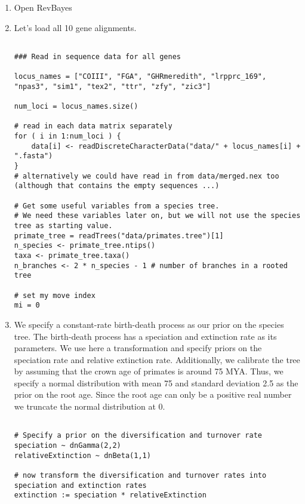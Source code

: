 \begin{enumerate}
\item Open RevBayes
\item Let's load all 10 gene alignments.

{\tt \begin{snugshade*}
\begin{lstlisting}

### Read in sequence data for all genes

locus_names = ["COIII", "FGA", "GHRmeredith", "lrpprc_169", "npas3", "sim1", "tex2", "ttr", "zfy", "zic3"]

num_loci = locus_names.size()

# read in each data matrix separately
for ( i in 1:num_loci ) {
    data[i] <- readDiscreteCharacterData("data/" + locus_names[i] + ".fasta")
}
# alternatively we could have read in from data/merged.nex too (although that contains the empty sequences ...)

# Get some useful variables from a species tree.
# We need these variables later on, but we will not use the species tree as starting value.
primate_tree = readTrees("data/primates.tree")[1]
n_species <- primate_tree.ntips()
taxa <- primate_tree.taxa()
n_branches <- 2 * n_species - 1 # number of branches in a rooted tree

# set my move index
mi = 0

\end{lstlisting}
\end{snugshade*}}

\item We specify a constant-rate birth-death process as our prior on the species tree. 
The birth-death process has a speciation and extinction rate as its parameters. 
We use here a transformation and specify priors on the speciation rate and relative extinction rate.
Additionally, we calibrate the tree by assuming that the crown age of primates is around 75 MYA.
Thus, we specify a normal distribution with mean 75 and standard deviation 2.5 as the prior on the root age.
Since the root age can only be a positive real number we truncate the normal distribution at 0.

{\tt \begin{snugshade*}
\begin{lstlisting}

# Specify a prior on the diversification and turnover rate
speciation ~ dnGamma(2,2)
relativeExtinction ~ dnBeta(1,1)

# now transform the diversification and turnover rates into speciation and extinction rates
extinction := speciation * relativeExtinction


\end{lstlisting}
\end{snugshade*}}
\end{enumerate}
